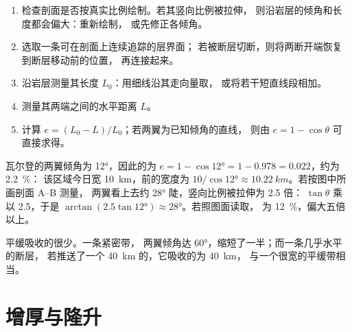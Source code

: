 \begin{method}[在剖面上测量缩短量]\label{met:g12:mountain-building:shortening}
\begin{enumerate}
  \item 检查剖面是否按真实比例绘制。若其竖向比例被拉伸，
        则沿岩层的倾角和长度都会偏大：重新绘制，
        或先修正各倾角。
  \item 选取一条可在剖面上连续追踪的层界面；
        若被断层切断，则将两断开端恢复到断层移动前的位置，
        再连接起来。
  \item 沿岩层测量其长度 $L_0$：用细线沿其走向量取，
        或将若干短直线段相加。
  \item 测量其两端之间的水平距离 $L$。
  \item 计算 $e = (L_0 - L)/L_0$；若两翼为已知倾角的直线，
        则由 $e = 1 - \cos\theta$ 可直接求得。
\end{enumerate}
\end{method}

\begin{example}[瓦尔登褶皱]\label{ex:g12:mountain-building:varden}
瓦尔登的两翼倾角为 \ang{12}，因此的为
$e = 1 - \cos\ang{12} = 1 - 0.978 = 0.022$，约为 \qty{2.2}{\percent}：
该区域今日宽 \qty{10}{km}，前的宽度为 $10/\cos\ang{12} \approx
\qty{10.22}{km}$。若按图中所画剖面 A--B 测量，
两翼看上去约 \ang{28} 陡，竖向比例被拉伸为 2.5 倍：
$\tan\theta$ 乘以 2.5，于是 $\arctan(2.5
\tan\ang{12}) \approx \ang{28}$。若照图面读取，
为 \qty{12}{\percent}，偏大五倍以上。
\end{example}

平缓吸收的很少。一条紧密带，
两翼倾角达 \ang{60}，缩短了一半；而一条几乎水平的断层，
若推送了一个 \qty{40}{km} 的，它吸收的为 \qty{40}{km}，
与一个很宽的平缓带相当。

\section{增厚与隆升}

